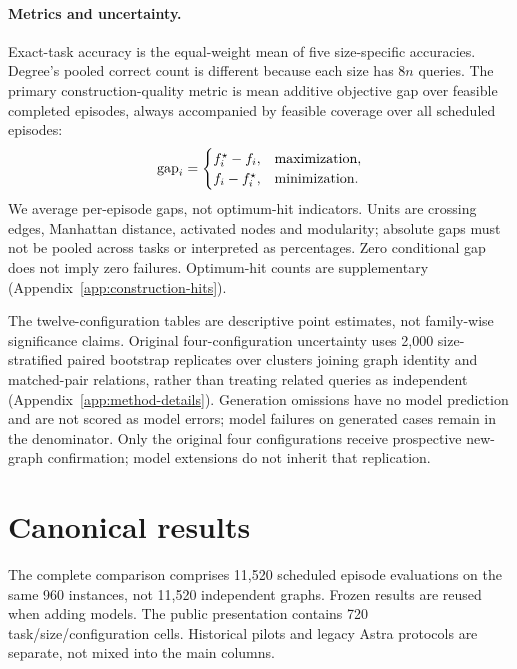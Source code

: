 \paragraph{Metrics and uncertainty.}
Exact-task accuracy is the equal-weight mean of five size-specific
accuracies. Degree's pooled correct count is different because each size has
$8n$ queries. The primary construction-quality metric is mean additive
objective gap over feasible completed episodes, always accompanied by
feasible coverage over all scheduled episodes:
\[
\operatorname{gap}_i=
\begin{cases}
f_i^\star-f_i,&\text{maximization},\\
f_i-f_i^\star,&\text{minimization}.
\end{cases}
\]
We average per-episode gaps, not optimum-hit indicators. Units are crossing
edges, Manhattan distance, activated nodes and modularity; absolute gaps
must not be pooled across tasks or interpreted as percentages.
Zero conditional gap does not imply zero failures. Optimum-hit counts
are supplementary (Appendix~\ref{app:construction-hits}).

The twelve-configuration tables are descriptive point estimates, not
family-wise significance claims. Original four-configuration uncertainty
uses 2,000 size-stratified paired bootstrap replicates over clusters joining
graph identity and matched-pair relations, rather than treating related
queries as independent (Appendix~\ref{app:method-details}).
Generation omissions have no model prediction and are not scored as model
errors; model failures on generated cases remain in the denominator.
Only the original four configurations receive prospective new-graph
confirmation; model extensions do not inherit that replication.

\section{Canonical results}
\label{sec:full-matrix}
The complete comparison comprises 11,520 scheduled episode evaluations on
the same 960 instances, not 11,520 independent graphs. Frozen results are
reused when adding models. The public presentation contains
720 task/size/configuration cells. Historical pilots and legacy Astra
protocols are separate, not mixed into the main columns.

\begin{table}[t]
\centering\small
\resizebox{\textwidth}{!}{}
\caption{Full canonical coverage. Exact feasibility means a valid returned
answer, not a correct answer. Construction feasibility requires a complete
legal trajectory. Input rejects and execution failures are episode counts.
All twelve configurations retain 960 scheduled cases. The lower block contains
GPT default-reasoning anchors, not matched-compute direct-decision baselines.}
\label{tab:full-coverage}
\end{table}

